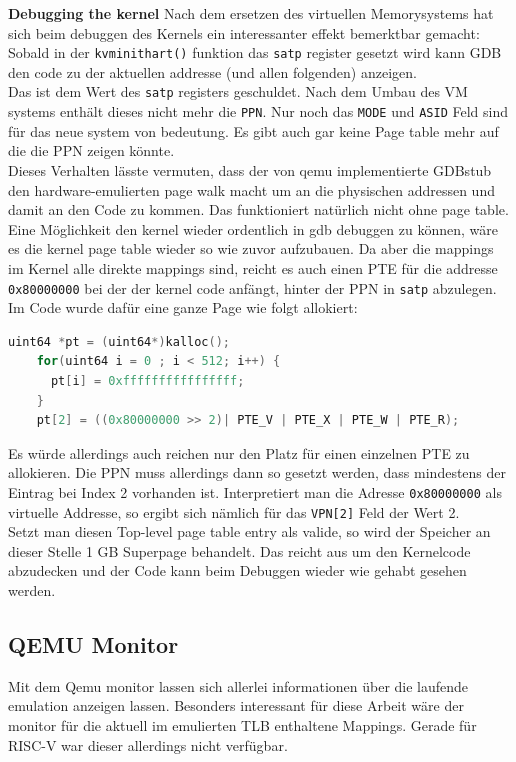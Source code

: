 \textbf{Debugging the kernel} Nach dem ersetzen des virtuellen Memorysystems hat sich beim
debuggen des Kernels ein interessanter effekt bemerktbar gemacht: Sobald in der
\texttt{kvminithart()} funktion das \texttt{satp} register gesetzt wird kann GDB den code zu der
aktuellen addresse (und allen folgenden) anzeigen.\\
Das ist dem Wert des \texttt{satp} registers geschuldet. Nach dem Umbau des VM systems enthält
dieses nicht mehr die \texttt{PPN}. Nur noch das \texttt{MODE} und \texttt{ASID} Feld sind
für das neue system von bedeutung. Es gibt auch gar keine Page table mehr auf die die PPN zeigen
könnte.\\
Dieses Verhalten lässte vermuten, dass der von qemu implementierte GDBstub den hardware-emulierten
page walk macht um an die physischen addressen und damit an den Code zu kommen. Das funktioniert
natürlich nicht ohne page table.\\
Eine Möglichkeit den kernel wieder ordentlich in gdb debuggen zu können, wäre es die kernel
page table wieder so wie zuvor aufzubauen. Da aber die mappings im Kernel alle direkte mappings
sind, reicht es auch einen PTE für die addresse \texttt{0x80000000} bei der der kernel code
anfängt, hinter der PPN in \texttt{satp} abzulegen.\\
Im Code wurde dafür eine ganze Page wie folgt allokiert:
\begin{lstlisting}[language=c,float=h!,
    label={lst:fake_pt}]
    uint64 *pt = (uint64*)kalloc();
    for(uint64 i = 0 ; i < 512; i++) {
      pt[i] = 0xffffffffffffffff;
    }
    pt[2] = ((0x80000000 >> 2)| PTE_V | PTE_X | PTE_W | PTE_R);
\end{lstlisting}
Es würde allerdings auch reichen nur den Platz für einen einzelnen PTE
zu allokieren. Die PPN muss allerdings dann so gesetzt werden,
dass mindestens der Eintrag bei Index 2 vorhanden ist. Interpretiert man
die Adresse \texttt{0x80000000} als virtuelle Addresse, so ergibt sich
nämlich für das \texttt{VPN[2]} Feld der Wert 2.\\
Setzt man diesen Top-level page table entry als valide, so wird der Speicher
an dieser Stelle 1 GB Superpage behandelt. Das reicht aus um den Kernelcode
abzudecken und der Code kann beim Debuggen wieder wie gehabt gesehen werden.

\subsection{QEMU Monitor}
Mit dem Qemu monitor lassen sich allerlei informationen über die laufende
emulation anzeigen lassen. Besonders interessant für diese Arbeit wäre der
monitor für die aktuell im emulierten TLB enthaltene Mappings. Gerade für
RISC-V war dieser allerdings nicht verfügbar.


